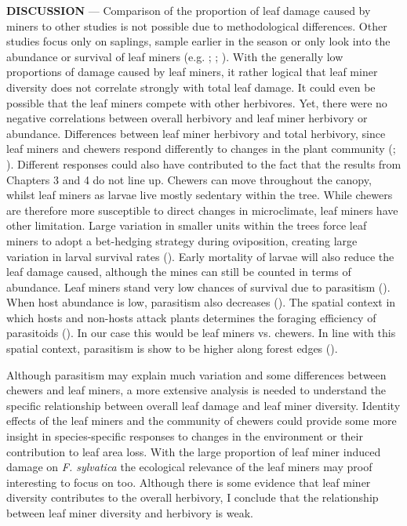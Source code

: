 \documentclass[b5paper,10pt]{book} %
\newenvironment{newchapterbox}{%
\def\chaptername{BOX}\def\appendixname{BOX}\appendices}%
{\endappendices}
\renewcommand{\appendixname}{}
\begin{document}
\begin{newchapterbox}
\newpage
	\textbf{DISCUSSION} --- Comparison of the proportion of leaf damage caused by miners to other studies is not possible due to methodological differences. Other studies focus only on saplings, sample earlier in the season or only look into the abundance or survival of leaf miners (e.g. \citealt{Sobek2009}; \citealt{Castagneyrol2012}; \citealt{Setiawan2014}). With the generally low proportions of damage caused by leaf miners, it rather logical that leaf miner diversity does not correlate strongly with total leaf damage. It could even be possible that the leaf miners compete with other herbivores. Yet, there were no negative correlations between overall herbivory and leaf miner herbivory or abundance. Differences between leaf miner herbivory and total herbivory, since leaf miners and chewers respond differently to changes in the plant community (\citealt{Andow1991}; \citealt{Castagneyrol2013}). Different responses could also have contributed to the fact that the results from Chapters 3 and 4 do not line up. Chewers can move throughout the canopy, whilst leaf miners as larvae live mostly sedentary within the tree. While chewers are therefore more susceptible to direct changes in microclimate, leaf miners have other limitation. Large variation in smaller units within the trees force leaf miners to adopt a bet-hedging strategy during oviposition, creating large variation in larval survival rates (\citealt{Gripenberg2007a}). Early mortality of larvae will also reduce the leaf damage caused, although the mines can still be counted in terms of abundance. Leaf miners stand very low chances of survival due to parasitism (\citealt{Gripenberg2008}). When host abundance is low, parasitism also decreases (\citealt{Moreira2013}). The spatial context in which hosts and non-hosts attack plants determines the foraging efficiency of parasitoids (\citealt{Bukovinszky2012}). In our case this would be leaf miners vs. chewers. In line with this spatial context, parasitism is show to be higher along forest edges (\citealt{Murphy2016}). 

	Although parasitism may explain much variation and some differences between chewers and leaf miners, a more extensive analysis is needed to understand the specific relationship between overall leaf damage and leaf miner diversity. Identity effects of the leaf miners and the community of chewers could provide some more insight in species-specific responses to changes in the environment or their contribution to leaf area loss. With the large proportion of leaf miner induced damage on \textit{F. sylvatica} the ecological relevance of the leaf miners may proof interesting to focus on too. Although there is some evidence that leaf miner diversity contributes to the overall herbivory, I conclude that the relationship between leaf miner diversity and herbivory is weak. 

\newpage
\end{newchapterbox}
\end{document}

